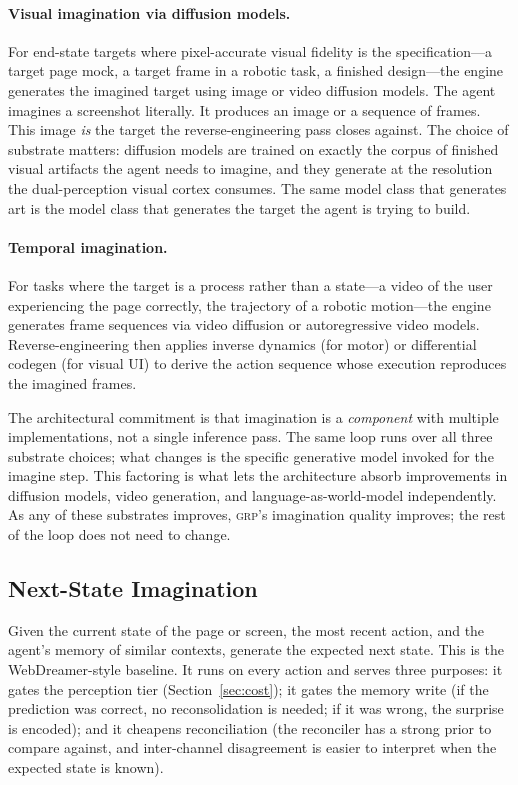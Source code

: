 \documentclass[12pt]{article}
\theoremstyle{definition}
\theoremstyle{remark}
\newcommand{\grp}{\textsc{grp}}
\begin{document}
\paragraph{Visual imagination via diffusion models.}
For end-state targets where pixel-accurate visual fidelity is the
specification---a target page mock, a target frame in a robotic task,
a finished design---the engine generates the imagined target using
image or video diffusion models. The agent imagines a screenshot
literally. It produces an image or a sequence of frames. This image
\emph{is} the target the reverse-engineering pass closes against.
The choice of substrate matters: diffusion models are trained on
exactly the corpus of finished visual artifacts the agent needs to
imagine, and they generate at the resolution the dual-perception
visual cortex consumes. The same model class that generates art is
the model class that generates the target the agent is trying to
build.

\paragraph{Temporal imagination.}
For tasks where the target is a process rather than a state---a video
of the user experiencing the page correctly, the trajectory of a
robotic motion---the engine generates frame sequences via video
diffusion or autoregressive video models. Reverse-engineering then
applies inverse dynamics (for motor) or differential codegen (for
visual UI) to derive the action sequence whose execution reproduces
the imagined frames.

\bigskip
\noindent
The architectural commitment is that imagination is a \emph{component}
with multiple implementations, not a single inference pass. The same
loop runs over all three substrate choices; what changes is the
specific generative model invoked for the imagine step. This factoring
is what lets the architecture absorb improvements in diffusion models,
video generation, and language-as-world-model independently. As any
of these substrates improves, \grp{}'s imagination quality improves;
the rest of the loop does not need to change.

\subsection{Next-State Imagination}
\label{subsec:next-state}

Given the current state of the page or screen, the most recent
action, and the agent's memory of similar contexts, generate the
expected next state. This is the WebDreamer-style baseline. It runs
on every action and serves three purposes: it gates the perception
tier (Section~\ref{sec:cost}); it gates the memory write (if the
prediction was correct, no reconsolidation is needed; if it was
wrong, the surprise is encoded); and it cheapens reconciliation (the
reconciler has a strong prior to compare against, and inter-channel
disagreement is easier to interpret when the expected state is
known).
\end{document}

